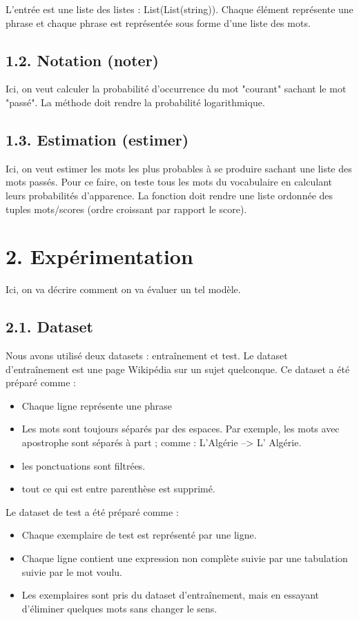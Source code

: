 \documentclass[11pt, a4paper]{article}
\begin{document}
L'entrée est une liste des listes : List(List(string)). 
Chaque élément représente une phrase et chaque phrase est représentée sous forme d'une liste des mots.


\subsection*{1.2. Notation (noter)}

Ici, on veut calculer la probabilité d'occurrence du mot "courant" sachant le mot "passé".
La méthode doit rendre la probabilité logarithmique. 


\subsection*{1.3. Estimation (estimer)}

Ici, on veut estimer les mots les plus probables à se produire sachant une liste des mots passés.
Pour ce faire, on teste tous les mots du vocabulaire en calculant leurs probabilités d'apparence.
La fonction doit rendre une liste ordonnée des tuples mots/scores (ordre croissant par rapport le score).


\section*{2. Expérimentation}

Ici, on va décrire comment on va évaluer un tel modèle.

\subsection*{2.1. Dataset}

Nous avons utilisé deux datasets : entraînement et test. 
Le dataset d'entraînement est une page Wikipédia sur un sujet quelconque. 
Ce dataset a été préparé comme : 
\begin{itemize}
	\item Chaque ligne représente une phrase
	\item Les mots sont toujours séparés par des espaces. 
	Par exemple, les mots avec apostrophe sont séparés à part ; comme : L'Algérie --> L' Algérie.
	\item les ponctuations sont filtrées.
	\item tout ce qui est entre parenthèse est supprimé.
\end{itemize}
Le dataset de test a été préparé comme :
\begin{itemize}
	\item Chaque exemplaire de test est représenté par une ligne.
	\item Chaque ligne contient une expression non complète suivie par une tabulation suivie par le mot voulu.
	\item Les exemplaires sont pris du dataset d'entraînement, mais en essayant d'éliminer quelques mots sans changer le sens. 
\end{itemize}
\end{document}
